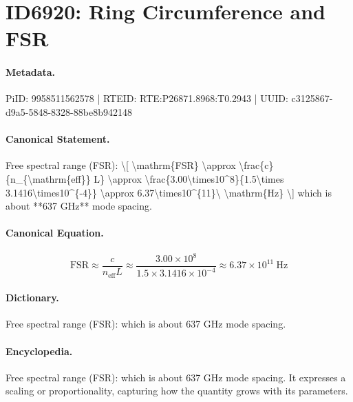 \section*{ID6920: Ring Circumference and FSR}
\paragraph{Metadata.}
PiID: 9958511562578 | RTEID: RTE:P26871.8968:T0.2943 | UUID: c3125867-d9a5-5848-8328-88be8b942148

\paragraph{Canonical Statement.}
Free spectral range (FSR): \textbackslash{}[ \textbackslash{}mathrm\{FSR\} \textbackslash{}approx \textbackslash{}frac\{c\}\{n\_\{\textbackslash{}mathrm\{eff\}\} L\} \textbackslash{}approx \textbackslash{}frac\{3.00\textbackslash{}times10\textasciicircum{}8\}\{1.5\textbackslash{}times 3.1416\textbackslash{}times10\textasciicircum{}\{-4\}\} \textbackslash{}approx 6.37\textbackslash{}times10\textasciicircum{}\{11\}\textbackslash{} \textbackslash{}mathrm\{Hz\} \textbackslash{}] which is about **637 GHz** mode spacing.

\paragraph{Canonical Equation.}
\[
\mathrm{FSR} \approx \frac{c}{n_{\mathrm{eff}} L} \approx \frac{3.00\times10^8}{1.5\times 3.1416\times10^{-4}} \approx 6.37\times10^{11}\ \mathrm{Hz}
\]

\paragraph{Dictionary.}
Free spectral range (FSR): which is about 637 GHz mode spacing.

\paragraph{Encyclopedia.}
Free spectral range (FSR): which is about 637 GHz mode spacing. It expresses a scaling or proportionality, capturing how the quantity grows with its parameters.
